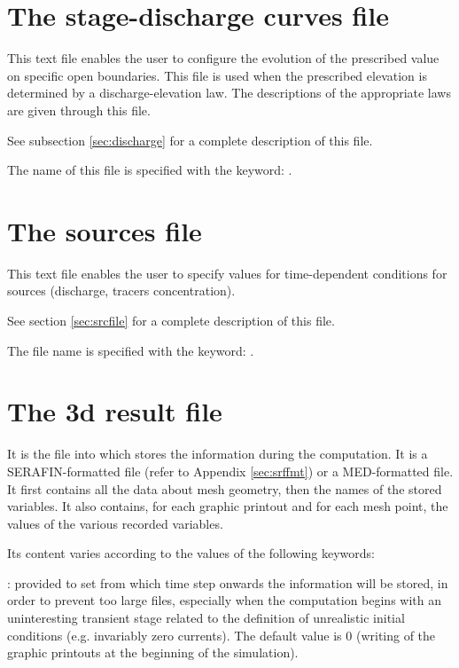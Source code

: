 \section{The stage-discharge curves file}

This text file enables the user to configure the evolution of the prescribed
value on specific open boundaries. This file is used when the prescribed
elevation is determined by a discharge-elevation law. The descriptions of the
appropriate laws are given through this file.

See subsection \ref{sec:discharge} for a complete description of this file.

The name of this file is specified with the keyword: .


\section{The sources file}

This text file enables the user to specify values for time-dependent conditions
for sources (discharge, tracers concentration).

See section \ref{sec:srcfile} for a complete description of this file.

The file name is specified with the keyword: .


\section{The 3d result file}
\label{sec:3dres}
It is the file into which  stores the information during the
computation. It is a SERAFIN-formatted file (refer to Appendix
\ref{sec:srffmt}) or a MED-formatted file. It first contains all the data about
mesh geometry, then the names of the stored variables. It also contains, for
each graphic printout and for each mesh point, the values of the various
recorded variables.

Its content varies according to the values of the following keywords:

: provided to set from
which time step onwards the information will be stored, in order to prevent too
large files, especially when the computation begins with an uninteresting
transient stage related to the definition of unrealistic initial conditions
(e.g. invariably zero currents). The default value is 0 (writing of the graphic
printouts at the beginning of the simulation).

